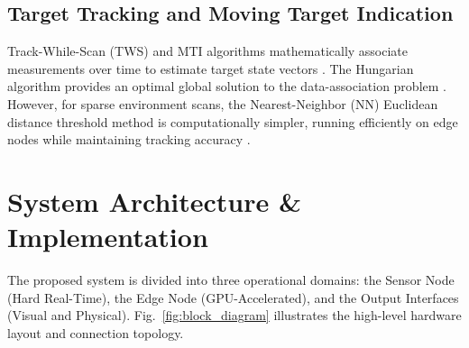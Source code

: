 \documentclass[conference]{IEEEtran}
\begin{document}
\subsection{Target Tracking and Moving Target Indication}
Track-While-Scan (TWS) and MTI algorithms mathematically associate measurements over time to estimate target state vectors \cite{Blackman1986, BarShalom2011}. The Hungarian algorithm provides an optimal global solution to the data-association problem \cite{Kuhn1955}. However, for sparse environment scans, the Nearest-Neighbor (NN) Euclidean distance threshold method is computationally simpler, running efficiently on edge nodes while maintaining tracking accuracy \cite{Streit1994}.

\section{System Architecture \& Implementation}
\label{sec:architecture}
The proposed system is divided into three operational domains: the Sensor Node (Hard Real-Time), the Edge Node (GPU-Accelerated), and the Output Interfaces (Visual and Physical). Fig.~\ref{fig:block_diagram} illustrates the high-level hardware layout and connection topology.
\end{document}
